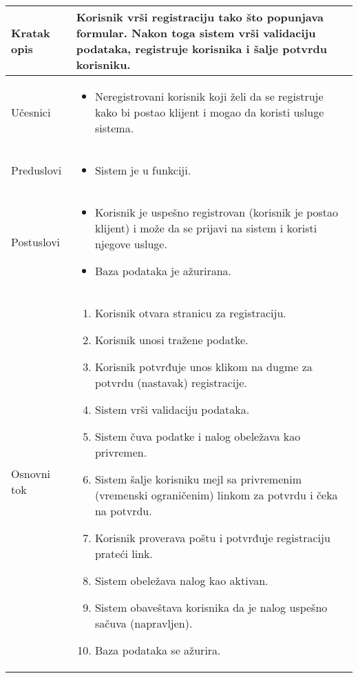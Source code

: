 \documentclass[../main.tex]{subfiles}
\begin{document}
\begin{longtable}{| p{} | p{} |}
\hline
    Kratak opis & Korisnik vrši registraciju tako što popunjava formular. Nakon toga sistem vrši validaciju podataka, registruje korisnika i šalje potvrdu korisniku.\\
\hline
    Učesnici & \begin{itemize}
        \item Neregistrovani korisnik koji želi da se registruje kako bi postao klijent i mogao da koristi usluge sistema.
        \end{itemize} \\
\hline

   Preduslovi & \begin{itemize}
    \item Sistem je u funkciji.
    \end{itemize} \\
\hline  
    Postuslovi & \begin{itemize}  \item Korisnik je uspešno registrovan (korisnik je postao klijent) i može da se prijavi na sistem i koristi njegove usluge.
    \item Baza podataka je ažurirana.
    \end{itemize} \\
\hline
    Osnovni tok & \begin{enumerate}
    \item Korisnik otvara stranicu za registraciju.
	\item Korisnik unosi tražene podatke.
	\item Korisnik potvrđuje unos klikom na dugme za potvrdu (nastavak) registracije.
	\item Sistem vrši validaciju podataka.
	\item Sistem čuva podatke i nalog obeležava kao privremen.
	\item Sistem šalje korisniku mejl sa privremenim (vremenski ograničenim) linkom za potvrdu i čeka na potvrdu.
	\item Korisnik proverava poštu i potvrđuje registraciju prateći link.
	\item Sistem obeležava nalog kao aktivan.
	\item Sistem obaveštava korisnika da je nalog uspešno sačuva (napravljen).
	\item Baza podataka se ažurira.

\end{enumerate}
\end{longtable}
\end{document}
